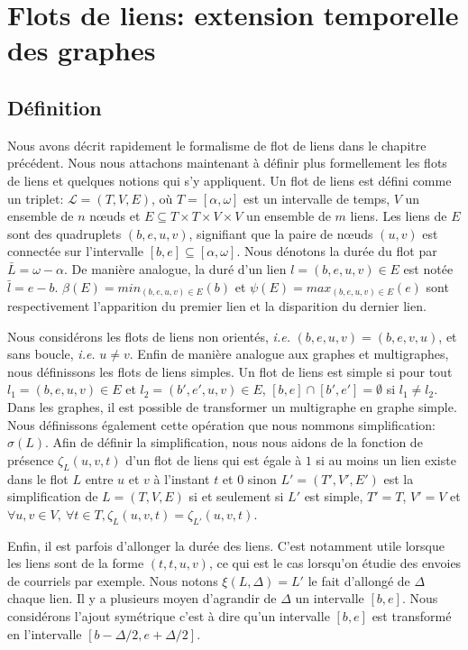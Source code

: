 \chapter{Flots de liens: extension temporelle des graphes}
\minitoc
\label{chap:def_flot}

\section{Définition}
\label{sec:definition}

Nous avons décrit rapidement le formalisme de flot de liens dans le chapitre précédent.
Nous nous attachons maintenant à définir plus formellement les flots de liens et quelques notions qui s'y appliquent.
Un flot de liens est défini comme un triplet: $\mathcal{L}=(T,V,E)$, où $T=[\alpha, \omega]$ est un intervalle de temps, $V$ un ensemble de $n$ n\oe uds et $E\subseteq T\times T \times V \times V$ un ensemble de $m$ liens.
Les liens de $E$ sont des quadruplets $(b,e,u,v)$, signifiant que la paire de n\oe uds $(u, v)$ est connectée sur l'intervalle $[b,e] \subseteq [\alpha,\omega]$.
Nous dénotons la durée du flot par $\bar{L}=\omega-\alpha$.
De manière analogue, la duré d'un lien $l=(b,e,u,v) \in E$ est notée   $\bar{l}=e-b$.
$\beta(E)= min_{(b,e,u,v) \in E} (b)$ et $\psi(E)= max_{(b,e,u,v) \in E} (e)$ sont respectivement l'apparition du premier lien et la disparition du dernier lien.

Nous considérons les flots de liens non orientés, \emph{i.e.} $(b,e,u,v)=(b,e,v,u)$, et sans boucle, \emph{i.e.} $u \neq v$.
Enfin de manière analogue aux graphes et multigraphes, nous définissons les flots de liens simples.
Un flot de liens est simple si pour tout $l_1=(b,e,u,v) \in E$ et $l_2=(b',e',u, v) \in E$, $[b,e]\cap [b', e'] = \emptyset$ si $l_1 \neq l_2$.
Dans les graphes, il est possible de transformer un multigraphe en graphe simple.
Nous définissons également cette opération que nous nommons simplification: $\sigma(L)$.
Afin de définir la simplification, nous nous aidons de la fonction de présence $\zeta_{L}(u,v,t)$ d'un flot de liens qui est égale à $1$ si au moins un lien existe dans le flot $L$ entre $u$ et $v$ à l'instant $t$ et $0$ sinon
$L'=(T',V',E')$ est la simplification de $L=(T,V,E)$ si et seulement si $L'$ est simple, $T'=T$, $V'=V$ et $\forall u,v \in V,\ \forall t\in T, \zeta_{L}(u,v,t)= \zeta_{L'}(u,v,t)$.

Enfin, il est parfois d'allonger la durée des liens.
C'est notamment utile lorsque les liens sont de la forme $(t,t,u,v)$, ce qui est le cas lorsqu'on étudie des envoies de courriels par exemple.
Nous notons $\xi(L,\Delta)=L'$ le fait d'allongé de $\Delta$ chaque lien.
Il y a plusieurs moyen d'agrandir de $\Delta$ un intervalle $[b,e]$.
Nous considérons l'ajout symétrique c'est à dire qu'un intervalle $[b,e]$ est transformé en l'intervalle $[b-\Delta/2,e+\Delta/2]$.

